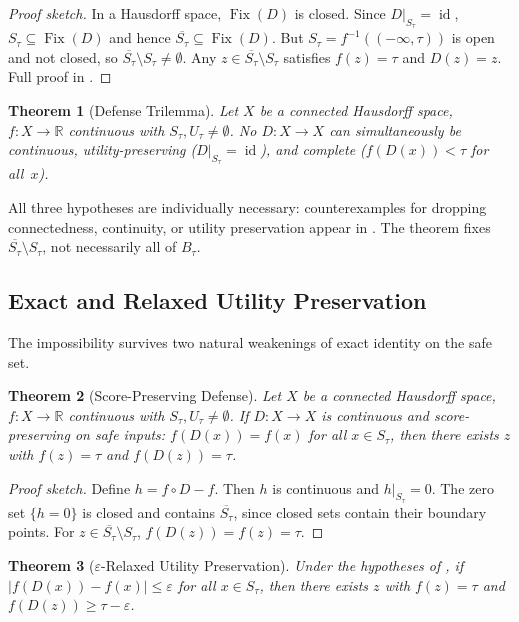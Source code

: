 \documentclass[11pt]{article}
\newtheorem{theorem}{Theorem}[section]
\newcommand{\R}{\mathbb{R}}
\newcommand{\cl}[1]{\overline{#1}}
\newcommand{\Fix}{\operatorname{Fix}}
\newcommand{\id}{\operatorname{id}}
\begin{document}
\begin{proof}[Proof sketch]
In a Hausdorff space, $\Fix(D)$ is closed. Since $D|_{S_\tau}=\id$,
$S_\tau \subseteq \Fix(D)$ and hence $\cl{S_\tau}\subseteq \Fix(D)$.
But $S_\tau=f^{-1}((-\infty,\tau))$ is open and not closed, so
$\cl{S_\tau}\setminus S_\tau \neq \emptyset$. Any
$z \in \cl{S_\tau}\setminus S_\tau$ satisfies $f(z)=\tau$ and $D(z)=z$.
Full proof in .
\end{proof}

\begin{theorem}[Defense Trilemma]
\label{thm:trilemma}
Let $X$ be a connected Hausdorff space, $f\colon X \to \R$ continuous
with $S_\tau, U_\tau \neq \emptyset$. No $D\colon X \to X$ can
simultaneously be continuous, utility-preserving ($D|_{S_\tau} = \id$),
and complete ($f(D(x)) < \tau$ for all~$x$).
\end{theorem}

All three hypotheses are individually necessary: counterexamples for
dropping connectedness, continuity, or utility preservation appear in
. The theorem fixes
$\cl{S_\tau}\setminus S_\tau$, not necessarily all of $B_\tau$.


\subsection{Exact and Relaxed Utility Preservation}
\label{sec:relaxed}

The impossibility survives two natural weakenings of exact identity on
the safe set.

\begin{theorem}[Score-Preserving Defense]
\label{thm:score-preserving}
Let $X$ be a connected Hausdorff space, $f\colon X\to\R$ continuous
with $S_\tau, U_\tau \neq \emptyset$. If $D\colon X \to X$ is
continuous and \emph{score-preserving on safe inputs}:
$f(D(x)) = f(x)$ for all $x \in S_\tau$, then there exists $z$ with
$f(z) = \tau$ and $f(D(z)) = \tau$.
\end{theorem}

\begin{proof}[Proof sketch]
Define $h = f \circ D - f$. Then $h$ is continuous and $h|_{S_\tau} = 0$.
The zero set $\{h = 0\}$ is closed and contains $\cl{S_\tau}$, since closed sets contain their boundary points. For
$z \in \cl{S_\tau} \setminus S_\tau$, $f(D(z)) = f(z) = \tau$.
\end{proof}

\begin{theorem}[$\varepsilon$-Relaxed Utility Preservation]
\label{thm:eps-relaxed}
Under the hypotheses of , if
$|f(D(x)) - f(x)| \leq \varepsilon$ for all $x \in S_\tau$, then
there exists $z$ with $f(z) = \tau$ and
$f(D(z)) \geq \tau - \varepsilon$.
\end{theorem}
\end{document}
